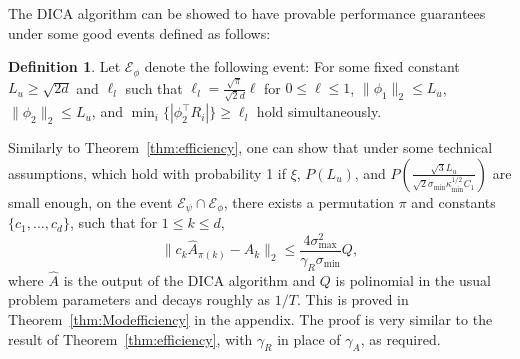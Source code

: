\documentclass[jmlr]{article}
\newcommand{\Epsi}{\mathcal{E}_{\psi}}
\newcommand{\Ephi}{\mathcal{E}_{\phi}}
\theoremstyle{definition}
\newtheorem{definition}[lemma]{Definition}
\begin{document}
The DICA algorithm can be showed to have provable performance guarantees under some good events defined as follows:
\begin{definition}
Let $\Ephi$ denote the following event:
For some fixed constant $L_u \ge \sqrt{2d}$ and $\ell_l$ such that $\ell_l = \frac{\sqrt{\pi}}{\sqrt{2}d}\ell$ for $0\le \ell\le 1$,
$\|\phi_1\|_2 \le L_u$, $\|\phi_2\|_2 \le L_u$, and $\min_i \{|\phi_2^{\top}R_i|\} \ge \ell_l$ hold simultaneously.
\end{definition}  
Similarly to Theorem~\ref{thm:efficiency}, one can show that under some technical assumptions, which 
hold with probability 1 if $\xi$, $P(L_u)$, and $P\left(\frac{\sqrt{3}L_u}{\sqrt{2}\sigma_{\min}\kappa_{\min}^{1/2}C_1}\right)$  are small enough,
on the event $\Epsi \cap\Ephi$,  there exists a permutation $\pi$ and constants $\{c_1,\ldots,c_d\}$, such that for $1\le k\le d$,
\[
\| c_k\hat{A}_{\pi(k)} - A_k\|_2 \le \frac{4\sigma^2_{\max}}{\gamma_R\sigma_{\min}} Q,
\]
where $\hat{A}$ is the output of the DICA algorithm and $Q$ is polinomial in the usual problem parameters and decays roughly as $1/T$. This is proved in Theorem~\ref{thm:Modefficiency} in the appendix.
The proof is very similar to the result of Theorem~\ref{thm:efficiency}, with $\gamma_R$ in place of $\gamma_A$, as required.
\end{document}
